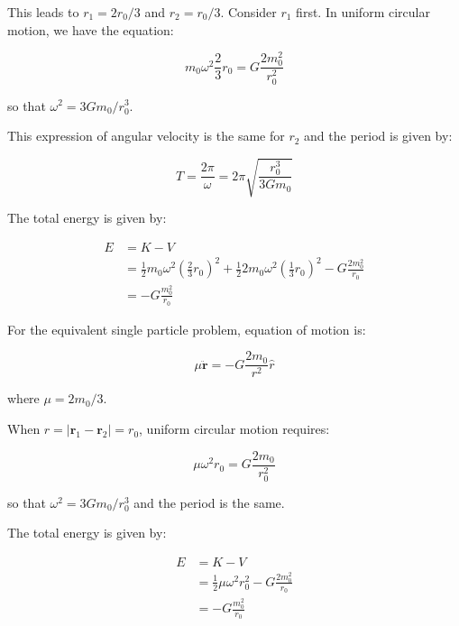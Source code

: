 \documentclass[12pt]{article}
\begin{document}
This leads to $r_{1} = 2r_{0}/3$ and $r_{2} = r_{0}/3$. Consider $r_{1}$ first. In uniform circular motion, we have the equation:

\begin{equation}
    m_{0} \omega^{2} \frac{2}{3} r_{0} = G \frac{2m_{0}^{2}}{r_{0}^{2}}
\end{equation}

so that $\omega^{2} = 3Gm_{0}/r_{0}^{3}$.

This expression of angular velocity is the same for $r_{2}$ and the period is given by:

\begin{equation}
    T = \frac{2\pi}{\omega} = 2\pi \sqrt{\frac{r_{0}^{3}}{3Gm_{0}}}
\end{equation}

The total energy is given by:

\begin{equation}
\begin{split}
    E &= K - V \\
    &= \frac{1}{2} m_{0} \omega^{2} \left( \frac{2}{3} r_{0} \right)^{2} + \frac{1}{2} 2m_{0} \omega^{2} \left( \frac{1}{3} r_{0} \right)^{2} - G\frac{2m_{0}^{2}}{r_{0}} \\
    &= -G \frac{m_{0}^{2}}{r_{0}}
\end{split}
\end{equation}

For the equivalent single particle problem, equation of motion is:

\begin{equation}
    \mu \ddot{\mathbf{r}} = -G \frac{2m_{0}}{r^{2}} \hat{r}
\end{equation}

where $\mu = 2m_{0}/3$.

When $r = \left\lvert \mathbf{r}_{1} - \mathbf{r}_{2} \right\rvert = r_{0}$, uniform circular motion requires:

\begin{equation}
    \mu \omega^{2} r_{0} = G \frac{2m_{0}}{r_{0}^{2}}
\end{equation}

so that $\omega^{2} = 3Gm_{0}/r_{0}^{3}$ and the period is the same.

The total energy is given by:

\begin{equation}
\begin{split}
    E &= K - V \\
    &= \frac{1}{2} \mu \omega^{2} r_{0}^{2} - G \frac{2m_{0}^{2}}{r_{0}} \\
    &= -G \frac{m_{0}^{2}}{r_{0}}
\end{split}
\end{equation}
\end{document}

